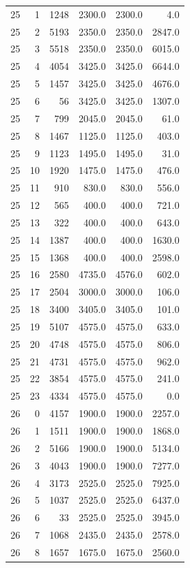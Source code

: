 \begin{longtable}{rrrrrr}
25 & 1 & 1248 & 2300.0 & 2300.0 & 4.0\\
25 & 2 & 5193 & 2350.0 & 2350.0 & 2847.0\\
25 & 3 & 5518 & 2350.0 & 2350.0 & 6015.0\\
25 & 4 & 4054 & 3425.0 & 3425.0 & 6644.0\\
25 & 5 & 1457 & 3425.0 & 3425.0 & 4676.0\\
25 & 6 & 56 & 3425.0 & 3425.0 & 1307.0\\
25 & 7 & 799 & 2045.0 & 2045.0 & 61.0\\
25 & 8 & 1467 & 1125.0 & 1125.0 & 403.0\\
25 & 9 & 1123 & 1495.0 & 1495.0 & 31.0\\
25 & 10 & 1920 & 1475.0 & 1475.0 & 476.0\\
25 & 11 & 910 & 830.0 & 830.0 & 556.0\\
25 & 12 & 565 & 400.0 & 400.0 & 721.0\\
25 & 13 & 322 & 400.0 & 400.0 & 643.0\\
25 & 14 & 1387 & 400.0 & 400.0 & 1630.0\\
25 & 15 & 1368 & 400.0 & 400.0 & 2598.0\\
25 & 16 & 2580 & 4735.0 & 4576.0 & 602.0\\
25 & 17 & 2504 & 3000.0 & 3000.0 & 106.0\\
25 & 18 & 3400 & 3405.0 & 3405.0 & 101.0\\
25 & 19 & 5107 & 4575.0 & 4575.0 & 633.0\\
25 & 20 & 4748 & 4575.0 & 4575.0 & 806.0\\
25 & 21 & 4731 & 4575.0 & 4575.0 & 962.0\\
25 & 22 & 3854 & 4575.0 & 4575.0 & 241.0\\
25 & 23 & 4334 & 4575.0 & 4575.0 & 0.0\\
26 & 0 & 4157 & 1900.0 & 1900.0 & 2257.0\\
26 & 1 & 1511 & 1900.0 & 1900.0 & 1868.0\\
26 & 2 & 5166 & 1900.0 & 1900.0 & 5134.0\\
26 & 3 & 4043 & 1900.0 & 1900.0 & 7277.0\\
26 & 4 & 3173 & 2525.0 & 2525.0 & 7925.0\\
26 & 5 & 1037 & 2525.0 & 2525.0 & 6437.0\\
26 & 6 & 33 & 2525.0 & 2525.0 & 3945.0\\
26 & 7 & 1068 & 2435.0 & 2435.0 & 2578.0\\
26 & 8 & 1657 & 1675.0 & 1675.0 & 2560.0\\

\end{longtable}

